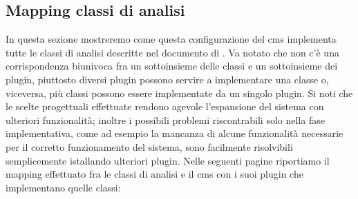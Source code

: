 \subsection{Mapping classi di analisi}
In questa sezione mostreremo come questa configurazione del \gls{cms} implementa tutte le classi di analisi descritte nel documento di . Va notato che non c'è una corrispondenza biunivoca fra un sottoinsieme delle classi e un sottoinsieme dei plugin, piuttosto diversi plugin possono servire a implementare una classe o, viceversa, più classi possono essere implementate da un singolo plugin.
Si noti che le scelte progettuali effettuate rendono agevole l'espansione del sistema con ulteriori funzionalità; inoltre i possibili problemi riscontrabili solo nella fase implementativa, come ad esempio la mancanza di alcune funzionalità necessarie per il corretto funzionamento del sistema, sono facilmente risolvibili semplicemente istallando ulteriori plugin. 
Nelle seguenti pagine riportiamo il mapping effettuato fra le classi di analisi e il \gls{cms} con i suoi plugin che implementano quelle classi:

